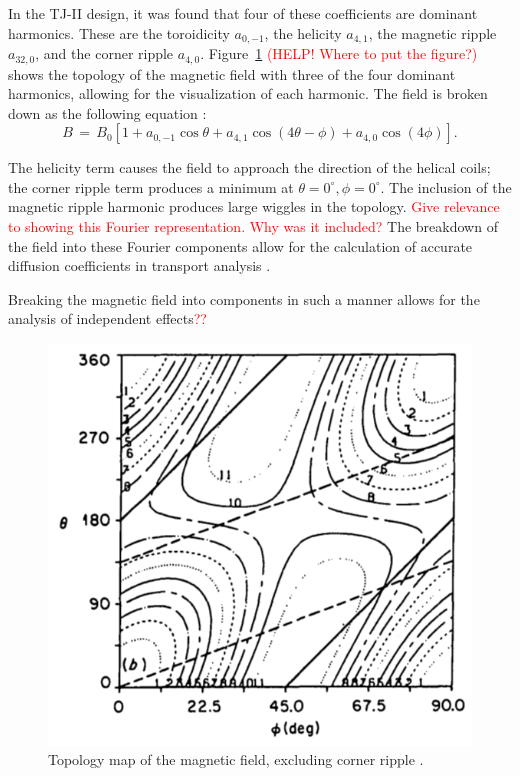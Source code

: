 \documentclass[a4paper]{article}
\newcommand\mynotes[1]{\textcolor{red}{#1}}
\begin{document}
In the TJ-II design, it was found that four of these coefficients are dominant harmonics.
These are the toroidicity $a_{0,-1}$, the helicity $a_{4,1}$, the magnetic ripple $a_{32,0}$, and the corner ripple $a_{4,0}$.
Figure~\ref{fig:topology} \mynotes{(HELP! Where to put the figure?)} shows the topology of the magnetic field with three of the four dominant harmonics, allowing for the visualization of each harmonic. The field is broken down as the following equation \cite{solano_study_1988}:
\begin{equation}
	B \,=\,B_0\left[1 + a_{0,-1}\cos\theta + a_{4,1}\cos\left(4\theta - \phi\right) + a_{4,0}\cos\left(4\phi\right)\right].
\end{equation}

The helicity term causes the field to approach the direction of the helical coils; the corner ripple term produces a minimum at $\theta = 0^{\circ}, \phi = 0^{\circ}$.
The inclusion of the magnetic ripple harmonic produces large wiggles in the topology.
\mynotes{Give relevance to showing this Fourier representation. Why was it included?}
The breakdown of the field into these Fourier components allow for the calculation of accurate diffusion coefficients in transport analysis \cite{solano_study_1988}.

Breaking the magnetic field into components in such a manner allows for the analysis of independent effects\mynotes{??}

\begin{figure}
	\includegraphics[width=0.5\linewidth]{../Graphics/Bcontours.png}
	\caption{Topology map of the magnetic field, excluding corner ripple \cite{solano_study_1988}.}
	\label{fig:topology}
\end{figure}
\end{document}
